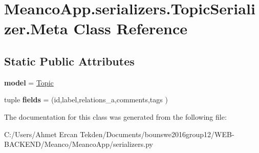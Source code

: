 \hypertarget{class_meanco_app_1_1serializers_1_1_topic_serializer_1_1_meta}{}\section{Meanco\+App.\+serializers.\+Topic\+Serializer.\+Meta Class Reference}
\label{class_meanco_app_1_1serializers_1_1_topic_serializer_1_1_meta}
\subsection*{Static Public Attributes}
\begin{DoxyCompactItemize}
\item 
\hypertarget{class_meanco_app_1_1serializers_1_1_topic_serializer_1_1_meta_ae6f5e427c83cbd5ff7cf010f93b7abc5}{}\label{class_meanco_app_1_1serializers_1_1_topic_serializer_1_1_meta_ae6f5e427c83cbd5ff7cf010f93b7abc5} 
{\bfseries model} = \hyperlink{class_meanco_app_1_1models_1_1topic_1_1_topic}{Topic}
\item 
\hypertarget{class_meanco_app_1_1serializers_1_1_topic_serializer_1_1_meta_a667647399eaef66912f8aa52311cc6bb}{}\label{class_meanco_app_1_1serializers_1_1_topic_serializer_1_1_meta_a667647399eaef66912f8aa52311cc6bb} 
tuple {\bfseries fields} = (\textquotesingle{}id\textquotesingle{},\textquotesingle{}label\textquotesingle{},\textquotesingle{}relations\+\_\+a\textquotesingle{},\textquotesingle{}comments\textquotesingle{},\textquotesingle{}tags\textquotesingle{} )
\end{DoxyCompactItemize}


The documentation for this class was generated from the following file\+:\begin{DoxyCompactItemize}
\item 
C\+:/\+Users/\+Ahmet Ercan Tekden/\+Documents/bounswe2016group12/\+W\+E\+B-\/\+B\+A\+C\+K\+E\+N\+D/\+Meanco/\+Meanco\+App/serializers.\+py\end{DoxyCompactItemize}
